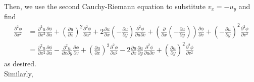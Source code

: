 \documentclass{article}
\begin{document}
Then, we use the second Cauchy-Riemann equation to substitute $v_x=-u_y$ and find
\begin{equation*}
\begin{split}
    \frac{\partial^2\phi}{\partial x^2}&=
    \frac{\partial^2 u}{\partial x^2}\frac{\partial \phi}{\partial u}+(\frac{\partial u}{\partial x})^2\frac{\partial^2 \phi}{\partial u^2}+2\frac{\partial u}{\partial x}(-\frac{\partial u}{\partial y})\frac{\partial^2 \phi}{\partial u \partial v}+(\frac{\partial}{\partial x}(-\frac{\partial u}{\partial y}))\frac{\partial \phi}{\partial v}+(-\frac{\partial u}{\partial y})^2\frac{\partial^2 \phi}{\partial v^2}\\&=
    \frac{\partial^2 u}{\partial x^2}\frac{\partial \phi}{\partial u}-\frac{\partial^2 u}{\partial x\partial y}\frac{\partial \phi}{\partial v}+(\frac{\partial u}{\partial x})^2\frac{\partial^2 \phi}{\partial u^2}-2\frac{\partial u}{\partial x}\frac{\partial u}{\partial y}\frac{\partial^2 \phi}{\partial u \partial v}+(\frac{\partial u}{\partial y})^2\frac{\partial^2 \phi}{\partial v^2}
\end{split}
\end{equation*}
as desired. \\
Similarly, 
\end{document}
